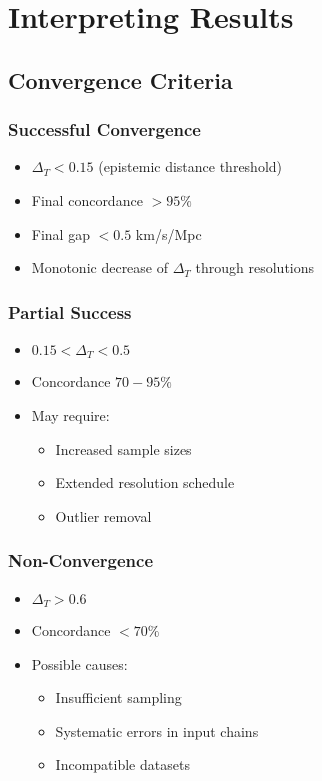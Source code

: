 \documentclass[11pt]{article}
\begin{document}
\section{Interpreting Results}

\subsection{Convergence Criteria}

\subsubsection{Successful Convergence}
\begin{itemize}
    \item $\Delta_T < 0.15$ (epistemic distance threshold)
    \item Final concordance $> 95\%$
    \item Final gap $< 0.5$ km/s/Mpc
    \item Monotonic decrease of $\Delta_T$ through resolutions
\end{itemize}

\subsubsection{Partial Success}
\begin{itemize}
    \item $0.15 < \Delta_T < 0.5$
    \item Concordance $70-95\%$
    \item May require:
        \begin{itemize}
            \item Increased sample sizes
            \item Extended resolution schedule
            \item Outlier removal
        \end{itemize}
\end{itemize}

\subsubsection{Non-Convergence}
\begin{itemize}
    \item $\Delta_T > 0.6$
    \item Concordance $< 70\%$
    \item Possible causes:
        \begin{itemize}
            \item Insufficient sampling
            \item Systematic errors in input chains
            \item Incompatible datasets
        \end{itemize}
\end{itemize}
\end{document}
